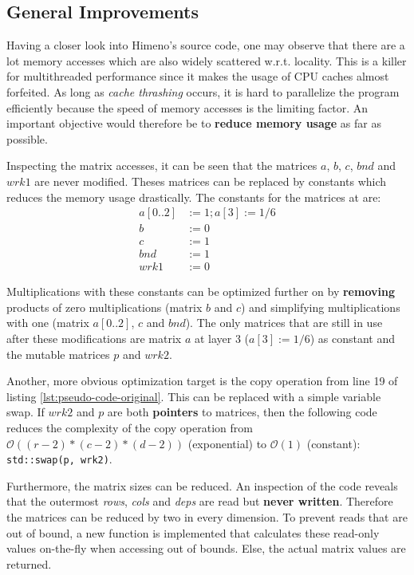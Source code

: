 \subsection{General Improvements}
\label{ssec:general-improvements}

Having a closer look into Himeno's source code, one may observe that there are a lot memory accesses which are also widely scattered w.r.t. locality. This is a killer for multithreaded performance since it makes the usage of CPU caches almost forfeited. As long as \textit{cache thrashing} occurs, it is hard to parallelize the program efficiently because the speed of memory accesses is the limiting factor. An important objective would therefore be to \textbf{reduce memory usage} as far as possible.

Inspecting the matrix accesses, it can be seen that the matrices $a$, $b$, $c$, $bnd$ and $wrk1$ are never modified. Theses matrices can be replaced by constants which reduces the memory usage drastically. The constants for the matrices at are:
\begin{align*}
    a[0..2] &:= 1; a[3] := 1/6 \\
    b &:= 0 \\
    c &:= 1 \\
    bnd &:= 1 \\
    wrk1 &:= 0
\end{align*}

Multiplications with these constants can be optimized further on by \textbf{removing} products of zero multiplications (matrix $b$ and $c$) and simplifying multiplications with one (matrix $a[0..2]$, $c$ and $bnd$). The only matrices that are still in use after these modifications are matrix $a$ at layer 3 ($a[3] := 1/6$) as constant and the mutable matrices $p$ and $wrk2$.

Another, more obvious optimization target is the copy operation from line 19 of listing \ref{lst:pseudo-code-original}. This can be replaced with a simple variable swap. If $wrk2$ and $p$ are both \textbf{pointers} to matrices, then the following code reduces the complexity of the copy operation from $\mathcal{O}((r-2)*(c-2)*(d-2))$ (exponential) to $\mathcal{O}(1)$ (constant): \verb+std::swap(p, wrk2)+.

Furthermore, the matrix sizes can be reduced. An inspection of the code reveals that the outermost \textit{rows}, \textit{cols} and \textit{deps} are read but \textbf{never written}. Therefore the matrices can be reduced by two in every dimension. To prevent reads that are out of bound, a new function is implemented that calculates these read-only values on-the-fly when accessing out of bounds. Else, the actual matrix values are returned.

